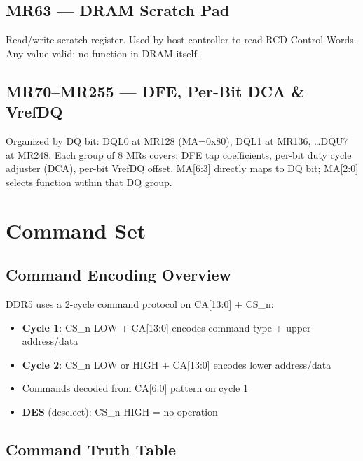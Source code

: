 \documentclass[10pt,a4paper,twoside]{article}
\begin{document}
\subsection{MR63 --- DRAM Scratch Pad}

Read/write scratch register. Used by host controller to read RCD Control Words.
Any value valid; no function in DRAM itself.

\subsection{MR70--MR255 --- DFE, Per-Bit DCA \& VrefDQ}

Organized by DQ bit: DQL0 at MR128 (MA=0x80), DQL1 at MR136, \ldots DQU7 at MR248.
Each group of 8 MRs covers: DFE tap coefficients, per-bit duty cycle adjuster (DCA), per-bit VrefDQ offset.
MA[6:3] directly maps to DQ bit; MA[2:0] selects function within that DQ group.

\section{Command Set}

\subsection{Command Encoding Overview}

DDR5 uses a 2-cycle command protocol on CA[13:0] + CS\_n:
\begin{itemize}
  \item \textbf{Cycle 1}: CS\_n LOW + CA[13:0] encodes command type + upper address/data
  \item \textbf{Cycle 2}: CS\_n LOW or HIGH + CA[13:0] encodes lower address/data
  \item Commands decoded from CA[6:0] pattern on cycle 1
  \item \textbf{DES} (deselect): CS\_n HIGH = no operation
\end{itemize}

\subsection{Command Truth Table}
\end{document}
